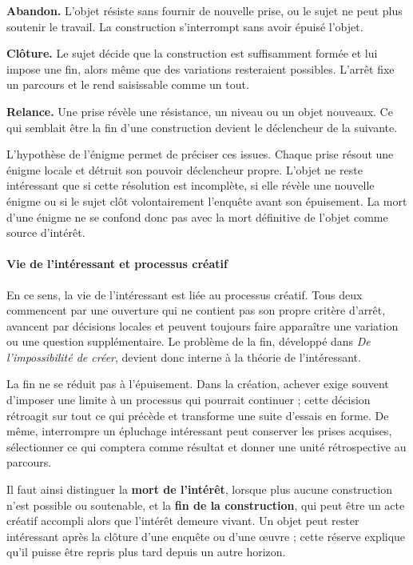 \documentclass[10pt,a4paper]{article}
\begin{document}
\textbf{Abandon.} L'objet résiste sans fournir de nouvelle prise, ou le sujet ne peut plus soutenir le travail. La construction s'interrompt sans avoir épuisé l'objet.

\textbf{Clôture.} Le sujet décide que la construction est suffisamment formée et lui impose une fin, alors même que des variations resteraient possibles. L'arrêt fixe un parcours et le rend saisissable comme un tout.

\textbf{Relance.} Une prise révèle une résistance, un niveau ou un objet nouveaux. Ce qui semblait être la fin d'une construction devient le déclencheur de la suivante.

L'hypothèse de l'énigme permet de préciser ces issues. Chaque prise résout une énigme locale et détruit son pouvoir déclencheur propre. L'objet ne reste intéressant que si cette résolution est incomplète, si elle révèle une nouvelle énigme ou si le sujet clôt volontairement l'enquête avant son épuisement. La mort d'une énigme ne se confond donc pas avec la mort définitive de l'objet comme source d'intérêt.

\paragraph{Vie de l'intéressant et processus créatif}
En ce sens, la vie de l'intéressant est liée au processus créatif. Tous deux commencent par une ouverture qui ne contient pas son propre critère d'arrêt, avancent par décisions locales et peuvent toujours faire apparaître une variation ou une question supplémentaire. Le problème de la fin, développé dans \emph{De l'impossibilité de créer}, devient donc interne à la théorie de l'intéressant.

La fin ne se réduit pas à l'épuisement. Dans la création, achever exige souvent d'imposer une limite à un processus qui pourrait continuer ; cette décision rétroagit sur tout ce qui précède et transforme une suite d'essais en forme. De même, interrompre un épluchage intéressant peut conserver les prises acquises, sélectionner ce qui comptera comme résultat et donner une unité rétrospective au parcours.

Il faut ainsi distinguer la \textbf{mort de l'intérêt}, lorsque plus aucune construction n'est possible ou soutenable, et la \textbf{fin de la construction}, qui peut être un acte créatif accompli alors que l'intérêt demeure vivant. Un objet peut rester intéressant après la clôture d'une enquête ou d'une œuvre ; cette réserve explique qu'il puisse être repris plus tard depuis un autre horizon.
\end{document}
